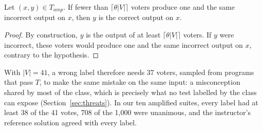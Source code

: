 \documentclass[acmsmall,screen,review,anonymous,nonacm]{acmart}
\newcommand{\V}[1]{\ensuremath{\mathit{#1}}}
\begin{document}
\begin{proposition}\label{prop:label}
Let $(x, y) \in T_{\V{amp}}$. If fewer than $\lceil \theta |V| \rceil$ voters produce one and the same incorrect output on $x$, then $y$ is the correct output on $x$.
\end{proposition}
\begin{proof}
By construction, $y$ is the output of at least $\lceil \theta |V| \rceil$ voters. If $y$ were incorrect, these voters would produce one and the same incorrect output on $x$, contrary to the hypothesis.
\end{proof}
With $|V| = 41$, a wrong label therefore needs 37 voters, sampled from programs that pass $T$, to make the same mistake on the same input: a misconception shared by most of the class, which is precisely what no test labelled by the class can expose (Section~\ref{sec:threats}). In our ten amplified suites, every label had at least 38 of the 41 votes, 708 of the 1{,}000 were unanimous, and the instructor's reference solution agreed with every label.
\end{document}
